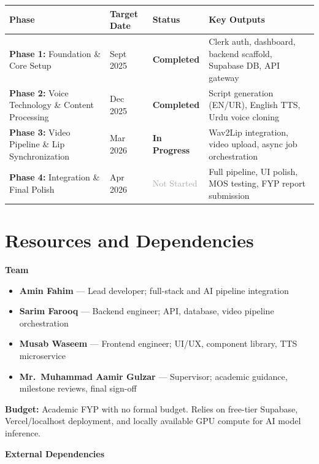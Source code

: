 ﻿\documentclass[12pt, a4paper]{article}
\newcommand{\thead}[1]{\cellcolor{headerbg}\textcolor{headertext}{\textbf{#1}}}
\newcommand{\talt}{\rowcolor{rowalt}}
\newcommand{\done}{\textcolor{statusgreen}{\textbf{Completed}}}
\newcommand{\inprogress}{\textcolor{statuspending}{\textbf{In Progress}}}
\newcommand{\notstarted}{\textcolor{darkgray}{Not Started}}
\begin{document}
\begin{tabular}{>{\raggedright\arraybackslash}p{5.0cm}
                >{\centering\arraybackslash}p{2.2cm}
                >{\centering\arraybackslash}p{2.4cm}
                >{\raggedright\arraybackslash}p{3.8cm}}
  \toprule
  \thead{Phase} & \thead{Target Date} & \thead{Status} & \thead{Key Outputs} \\
  \midrule
  \textbf{Phase 1:} Foundation \& Core Setup
    & Sept 2025 & \done
    & Clerk auth, dashboard, backend scaffold, Supabase DB, API gateway \\
  \talt
  \textbf{Phase 2:} Voice Technology \& Content Processing
    & Dec 2025 & \done
    & Script generation (EN/UR), English TTS, Urdu voice cloning \\
  \textbf{Phase 3:} Video Pipeline \& Lip Synchronization
    & Mar 2026 & \inprogress
    & Wav2Lip integration, video upload, async job orchestration \\
  \talt
  \textbf{Phase 4:} Integration \& Final Polish
    & Apr 2026 & \notstarted
    & Full pipeline, UI polish, MOS testing, FYP report submission \\
  \bottomrule
\end{tabular}

\section{Resources and Dependencies}

\textbf{Team}
\begin{itemize}[leftmargin=1.4em, itemsep=2pt]
  \item \textbf{Amin Fahim} --- Lead developer; full-stack and AI pipeline integration
  \item \textbf{Sarim Farooq} --- Backend engineer; API, database, video pipeline orchestration
  \item \textbf{Musab Waseem} --- Frontend engineer; UI/UX, component library, TTS microservice
  \item \textbf{Mr.\ Muhammad Aamir Gulzar} --- Supervisor; academic guidance, milestone reviews, final sign-off
\end{itemize}

\textbf{Budget:} Academic FYP with no formal budget. Relies on free-tier
Supabase, Vercel/localhost deployment, and locally available GPU compute for
AI model inference.

\medskip
\textbf{External Dependencies}
\end{document}
